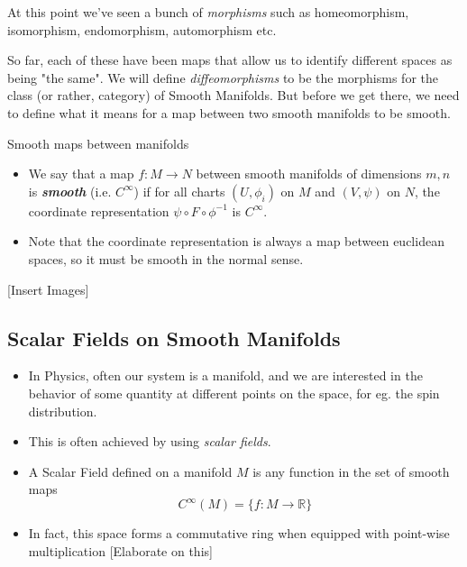 \documentclass{article}
\newcommand{\R}{\mathbb{R}}
\begin{document}
\vskip 0.25cm
At this point we've seen a bunch of \emph{morphisms} such as homeomorphism, isomorphism, endomorphism, automorphism etc. 

\vskip 0.25cm
So far, each of these have been maps that allow us to identify different spaces as being "the same". We will define \emph{diffeomorphisms} to be the morphisms for the class (or rather, category) of Smooth Manifolds. But before we get there, we need to define what it means for a map between two smooth manifolds to be smooth.

\vskip 0.25cm
\begin{mathdefinitionbox}{Smooth maps between manifolds}
\vskip 0.25cm
  \begin{itemize}
    \item We say that a map $f : M \rightarrow N$ between smooth manifolds of dimensions $m,n$ is \emph{\textbf{smooth}} (i.e. $C^{\infty}$) if for all charts $(U, \phi_i)$ on $M$ and $(V, \psi)$ on $N$, the coordinate representation $\psi \circ F \circ \phi^{-1}$ is $C^{\infty}$.
    \item Note that the coordinate representation is always a map between euclidean spaces, so it must be smooth in the normal sense.
  \end{itemize}
\end{mathdefinitionbox}

\vskip 0.25cm
[Insert Images]

\vskip 1cm
\subsection{Scalar Fields on Smooth Manifolds}

\begin{itemize}
  \item In Physics, often our system is a manifold, and we are interested in the behavior of some quantity at different points on the space, for eg. the spin distribution.
  \item This is often achieved by using \emph{scalar fields}.
\end{itemize}

\begin{mathdefinitionbox}{}
\begin{itemize}
  \item A Scalar Field defined on a manifold $M$ is any function in the set of smooth maps 
  \[  C^{\infty}(M) = \{f : M \rightarrow \R \} \]
  \item In fact, this space forms a commutative ring when equipped with point-wise multiplication [Elaborate on this]
\end{itemize}

\end{mathdefinitionbox}
\end{document}

